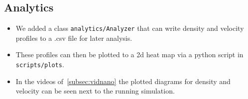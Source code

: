 \documentclass{article}
\begin{document}
\subsection{Analytics}
\label{subsec:ana}

    \begin{itemize}
        \item We added a class \texttt{analytics/Analyzer} that can write density and velocity profiles to a .csv file for later analysis.
        \item These profiles can then be plotted to a 2d heat map via a python script in \texttt{scripts/plots}.
        \item In the videos of\ \ref{subsec:vidnano} the plotted diagrams for density and velocity can be seen next to the running simulation.
    \end{itemize}
\end{document}
